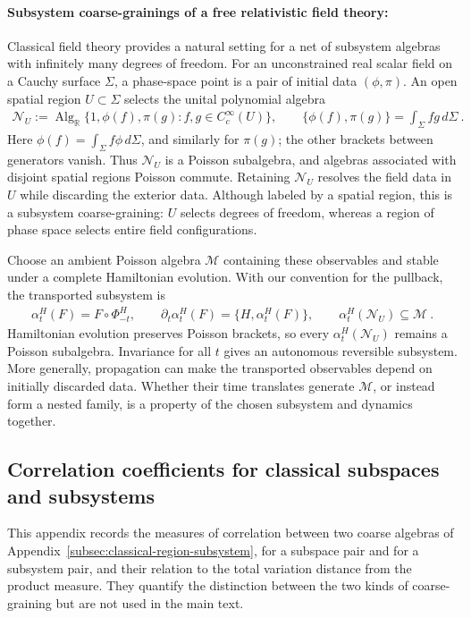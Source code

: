 \documentclass[a4paper,11pt]{article}
\theoremstyle{definition}
\newcommand{\mN}{\mathcal{N}}
\newcommand{\mM}{\mathcal{M}}
\begin{document}
\paragraph{Subsystem coarse-grainings of a free relativistic field theory:} Classical field theory provides a natural setting for a net of subsystem algebras with infinitely many degrees of freedom. For an unconstrained real scalar field on a Cauchy surface $\Sigma$, a phase-space point is a pair of initial data $(\phi,\pi)$. An open spatial region $U\subset\Sigma$ selects the unital polynomial algebra
\begin{align}
    \mN_U
    :=\operatorname{Alg}_{\mathbb R}\{1,\phi(f),\pi(g):f,g\in C_c^\infty(U)\},
    \qquad
    \{\phi(f),\pi(g)\}=\int_\Sigma fg\,d\Sigma\ .
\end{align}
Here $\phi(f)=\int_\Sigma f\phi\,d\Sigma$, and similarly for $\pi(g)$; the other brackets between generators vanish. Thus $\mN_U$ is a Poisson subalgebra, and algebras associated with disjoint spatial regions Poisson commute. Retaining $\mN_U$ resolves the field data in $U$ while discarding the exterior data. Although labeled by a spatial region, this is a subsystem coarse-graining: $U$ selects degrees of freedom, whereas a region of phase space selects entire field configurations.

Choose an ambient Poisson algebra $\mM$ containing these observables and stable under a complete Hamiltonian evolution. With our convention for the pullback, the transported subsystem is
\begin{align}
    \alpha_t^H(F)=F\circ\Phi_{-t}^H,
    \qquad \partial_t\alpha_t^H(F)=\{H,\alpha_t^H(F)\},
    \qquad \alpha_t^H(\mN_U)\subseteq\mM\ .
\end{align}
Hamiltonian evolution preserves Poisson brackets, so every $\alpha_t^H(\mN_U)$ remains a Poisson subalgebra. Invariance for all $t$ gives an autonomous reversible subsystem. More generally, propagation can make the transported observables depend on initially discarded data. Whether their time translates generate $\mM$, or instead form a nested family, is a property of the chosen subsystem and dynamics together.

\subsection{Correlation coefficients for classical subspaces and subsystems}\label{app:classical-correlations}

This appendix records the measures of correlation between two coarse algebras of Appendix~\ref{subsec:classical-region-subsystem}, for a subspace pair and for a subsystem pair, and their relation to the total variation distance from the product measure. They quantify the distinction between the two kinds of coarse-graining but are not used in the main text.
\end{document}
